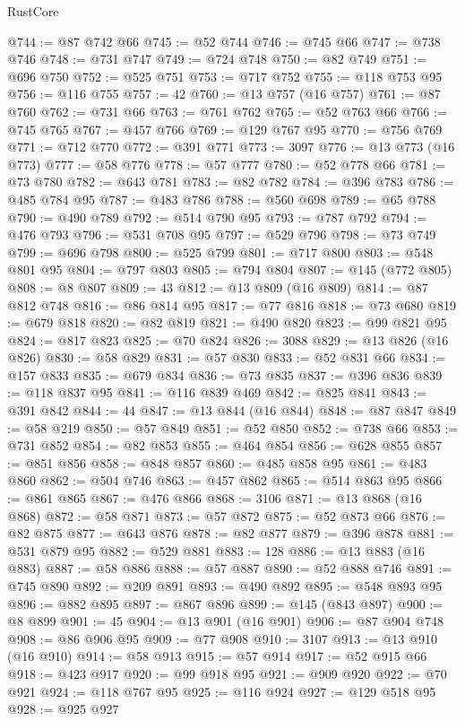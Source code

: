 \begin{lexlean}{RustCore}
\begin{coremodule}
@744 := @87 @742 @66
@745 := @52 @744
@746 := @745 @66
@747 := @738 @746
@748 := @731 @747
@749 := @724 @748
@750 := @82 @749
@751 := @696 @750
@752 := @525 @751
@753 := @717 @752
@755 := @118 @753 @95
@756 := @116 @755
@757 := 42
@760 := @13 @757 (@16 @757)
@761 := @87 @760
@762 := @731 @66
@763 := @761 @762
@765 := @52 @763 @66
@766 := @745 @765
@767 := @457 @766
@769 := @129 @767 @95
@770 := @756 @769
@771 := @712 @770
@772 := @391 @771
@773 := 3097
@776 := @13 @773 (@16 @773)
@777 := @58 @776
@778 := @57 @777
@780 := @52 @778 @66
@781 := @73 @780
@782 := @643 @781
@783 := @82 @782
@784 := @396 @783
@786 := @485 @784 @95
@787 := @483 @786
@788 := @560 @698
@789 := @65 @788
@790 := @490 @789
@792 := @514 @790 @95
@793 := @787 @792
@794 := @476 @793
@796 := @531 @708 @95
@797 := @529 @796
@798 := @73 @749
@799 := @696 @798
@800 := @525 @799
@801 := @717 @800
@803 := @548 @801 @95
@804 := @797 @803
@805 := @794 @804
@807 := @145 (@772 @805)
@808 := @8 @807
@809 := 43
@812 := @13 @809 (@16 @809)
@814 := @87 @812 @748
@816 := @86 @814 @95
@817 := @77 @816
@818 := @73 @680
@819 := @679 @818
@820 := @82 @819
@821 := @490 @820
@823 := @99 @821 @95
@824 := @817 @823
@825 := @70 @824
@826 := 3088
@829 := @13 @826 (@16 @826)
@830 := @58 @829
@831 := @57 @830
@833 := @52 @831 @66
@834 := @157 @833
@835 := @679 @834
@836 := @73 @835
@837 := @396 @836
@839 := @118 @837 @95
@841 := @116 @839 @469
@842 := @825 @841
@843 := @391 @842
@844 := 44
@847 := @13 @844 (@16 @844)
@848 := @87 @847
@849 := @58 @219
@850 := @57 @849
@851 := @52 @850
@852 := @738 @66
@853 := @731 @852
@854 := @82 @853
@855 := @464 @854
@856 := @628 @855
@857 := @851 @856
@858 := @848 @857
@860 := @485 @858 @95
@861 := @483 @860
@862 := @504 @746
@863 := @457 @862
@865 := @514 @863 @95
@866 := @861 @865
@867 := @476 @866
@868 := 3106
@871 := @13 @868 (@16 @868)
@872 := @58 @871
@873 := @57 @872
@875 := @52 @873 @66
@876 := @82 @875
@877 := @643 @876
@878 := @82 @877
@879 := @396 @878
@881 := @531 @879 @95
@882 := @529 @881
@883 := 128
@886 := @13 @883 (@16 @883)
@887 := @58 @886
@888 := @57 @887
@890 := @52 @888 @746
@891 := @745 @890
@892 := @209 @891
@893 := @490 @892
@895 := @548 @893 @95
@896 := @882 @895
@897 := @867 @896
@899 := @145 (@843 @897)
@900 := @8 @899
@901 := 45
@904 := @13 @901 (@16 @901)
@906 := @87 @904 @748
@908 := @86 @906 @95
@909 := @77 @908
@910 := 3107
@913 := @13 @910 (@16 @910)
@914 := @58 @913
@915 := @57 @914
@917 := @52 @915 @66
@918 := @423 @917
@920 := @99 @918 @95
@921 := @909 @920
@922 := @70 @921
@924 := @118 @767 @95
@925 := @116 @924
@927 := @129 @518 @95
@928 := @925 @927

\end{coremodule}
\end{lexlean}
